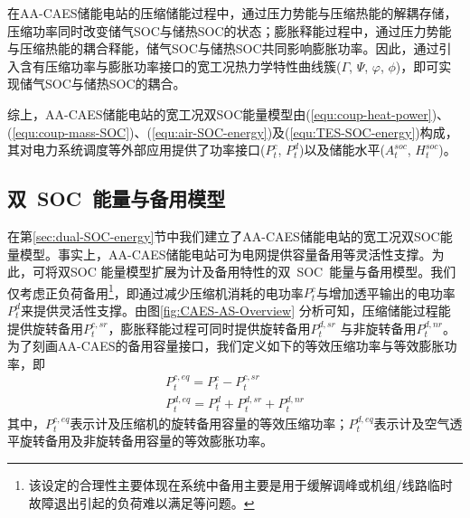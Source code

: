在AA-CAES储能电站的压缩储能过程中，通过压力势能与压缩热能的解耦存储，压缩功率同时改变储气SOC与储热SOC的状态；膨胀释能过程中，通过压力势能与压缩热能的耦合释能，储气SOC与储热SOC共同影响膨胀功率\cite{CAES-Wind-Rui-19}。因此，通过引入含有压缩功率与膨胀功率接口的宽工况热力学特性曲线簇($\Gamma$, $\Psi$, $\varphi$, $\phi$)，即可实现储气SOC与储热SOC的耦合\cite{CAES-Wind-Rui-19}。

综上，AA-CAES储能电站的宽工况双SOC能量模型由(\ref{equ:coup-heat-power})、(\ref{equ:coup-mass-SOC})、(\ref{equ:air-SOC-energy})及(\ref{equ:TES-SOC-energy})构成，其对电力系统调度等外部应用提供了功率接口($P_t^c$, $P_t^d$)以及储能水平($A_t^{soc}$, $H_t^{soc}$)。

\subsection{双~SOC~能量与备用模型}
\label{sec:dual-SOC-Reserve}

在第\ref{sec:dual-SOC-energy}节中我们建立了AA-CAES储能电站的宽工况双SOC能量模型。事实上，AA-CAES储能电站可为电网提供容量备用等灵活性支撑。为此，可将双SOC 能量模型扩展为计及备用特性的双~SOC~能量与备用模型。我们仅考虑正负荷备用\footnote{该设定的合理性主要体现在系统中备用主要是用于缓解调峰或机组/线路临时故障退出引起的负荷难以满足等问题。}，即通过减少压缩机消耗的电功率$P_t^c$与增加透平输出的电功率$P_t^d$来提供灵活性支撑。由图\ref{fig:CAES-AS-Overview} 分析可知，压缩储能过程能提供旋转备用$P_t^{c,sr}$，膨胀释能过程可同时提供旋转备用$P_t^{d,sr}$ 与非旋转备用$P_t^{d,nr}$。为了刻画AA-CAES的备用容量接口，我们定义如下的等效压缩功率与等效膨胀功率，即
\begin{subequations}
\label{equ:def-Pc-Pd-eq}
\begin{gather}
P_t^{c,eq} = P_t^c - P_t^{c,sr}\label{equ:def-Pc-eq}\\
P_t^{d,eq} = P_t^d + P_t^{d,sr} + P_t^{d,nr}\label{equ:def-Pd-eq}
\end{gather}
\end{subequations}
其中，$P_t^{c,eq}$表示计及压缩机的旋转备用容量的等效压缩功率；$P_t^{d,eq}$表示计及空气透平旋转备用及非旋转备用容量的等效膨胀功率。

